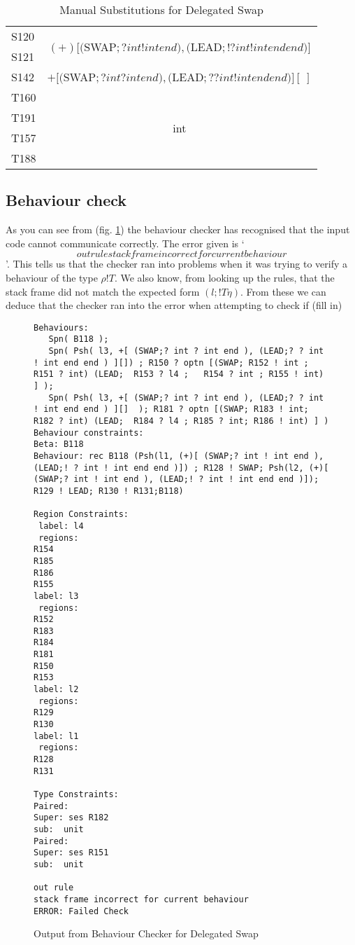 \begin{table}
\centering
\begin{tabular}{l |c}
S120 & \multirow{2}{*}{$(+) [($SWAP$; ? int ! int end ), ($LEAD$; ! ? int ! int end end)]$} \\
S121 & \\ \hline
S142 & $+ [($SWAP$; ? int ? int end), ($LEAD$; ? ? int ! int end end)] [\ ]$ \\ \hline
T160 & \multirow{4}{*}{int} \\
T191 & \\ 
T157 & \\
T188 & \\ 
\end{tabular}
\caption{Manual Substitutions for Delegated Swap}
\label{subs2}
\end{table}

\subsection{Behaviour check}

As you can see from (fig. \ref{bOut2}) the behaviour checker has recognised that the input code cannot communicate correctly. The error given is `$$out rule stack frame incorrect for current behaviour$$'. This tells us that the checker ran into problems when it was trying to verify a behaviour of the type $\rho!T$. We also know, from looking up the rules, that the stack frame did not match the expected form $(l; !T\eta)$. From these we can deduce that the checker ran into the error when attempting to check if (fill in)%

\begin{figure}
\begin{lstlisting}
Behaviours:
   Spn( B118 );
   Spn( Psh( l3, +[ (SWAP;? int ? int end ), (LEAD;? ? int ! int end end ) ][]) ; R150 ? optn [(SWAP; R152 ! int ; R151 ? int) (LEAD;  R153 ? l4 ;   R154 ? int ; R155 ! int) ] );  
   Spn( Psh( l3, +[ (SWAP;? int ? int end ), (LEAD;? ? int ! int end end ) ][]  ); R181 ? optn [(SWAP; R183 ! int; R182 ? int) (LEAD;  R184 ? l4 ; R185 ? int; R186 ! int) ] )
Behaviour constraints:
Beta: B118 
Behaviour: rec B118 (Psh(l1, (+)[ (SWAP;? int ! int end ), (LEAD;! ? int ! int end end )]) ; R128 ! SWAP; Psh(l2, (+)[ (SWAP;? int ! int end ), (LEAD;! ? int ! int end end )]); R129 ! LEAD; R130 ! R131;B118)

Region Constraints:
 label: l4
 regions:
R154
R185
R186
R155
label: l3
 regions:
R152
R183
R184
R181
R150
R153
label: l2
 regions:
R129
R130
label: l1
 regions:
R128
R131

Type Constraints:
Paired: 
Super: ses R182 
sub:  unit 
Paired: 
Super: ses R151
sub:  unit 

out rule
stack frame incorrect for current behaviour
ERROR: Failed Check
\end{lstlisting}
\caption{Output from Behaviour Checker for Delegated Swap}
\label{bOut2}
\end{figure}

